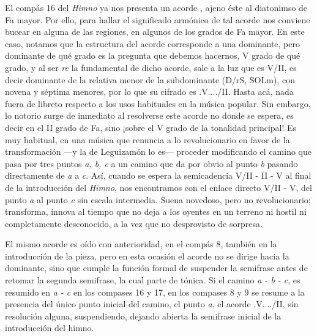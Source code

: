 El compás 16 del \emph{Himno} ya nos presenta un acorde \hbox{,} ajeno éste al diatonimso de Fa mayor. Por ello, para hallar el significado armónico de tal acorde nos conviene bucear en alguna de las regiones, en algunos de los grados de Fa mayor. En este caso, notamos que la estructura del acorde corresponde a una dominante, pero dominante de qué grado es la pregunta que debemos hacernos, V grado de qué grado, y al ser \emph{re} la fundamental de dicho acorde, sale a la luz que es V/II, es decir dominante de la relativa menor de la subdominante (D/rS, SOLm), con novena y séptima menores, por lo que su cifrado es \acorde.V..../II. Hasta acá, nada fuera de libreto respecto a los usos habituales en la música popular. Sin embargo, lo notorio surge de inmediato al resolverse este acorde no donde se espera, es decir en el II grado de Fa, sino ¡sobre el V grado de la tonalidad principal! Es muy habitual, en una música que renuncia a lo revolucionario en favor de la transformación ---y la de Leguizamón lo es--- proceder modificando el camino que pasa por tres puntos \emph{a, b, c} a un camino que da por obvio al punto \emph{b} pasando directamente de \emph{a} a \emph{c}. Así, cuando se espera la semicadencia V/II - II - V al final de la introducción del \emph{Himno}, nos encontramos con el enlace directo V/II - V, del punto \emph{a} al punto \emph{c} sin escala intermedia. Suena novedoso, pero no revolucionario; transforma, innova al tiempo que no deja a los oyentes en un terreno ni hostil ni completamente desconocido, a la vez que no desprovisto de sorpresa.

El mismo acorde es oído con anterioridad, en el compás 8, también en la introducción de la pieza, pero en esta ocasión el acorde no se dirige hacia la dominante, sino que cumple la función formal de suspender la semifrase antes de retomar la segunda semifrase, la cual parte de tónica. Si el camino \emph{a - b - c}, es resumido en \emph{a - c} en los compases 16 y 17, en los compases 8 y 9 se resume a la presencia del único punto inicial del camino, el punto \emph{a}, el acorde \acorde.V..../II, sin resolución alguna, suspendiendo, dejando abierta la semifrase inicial de la introducción del himno.

